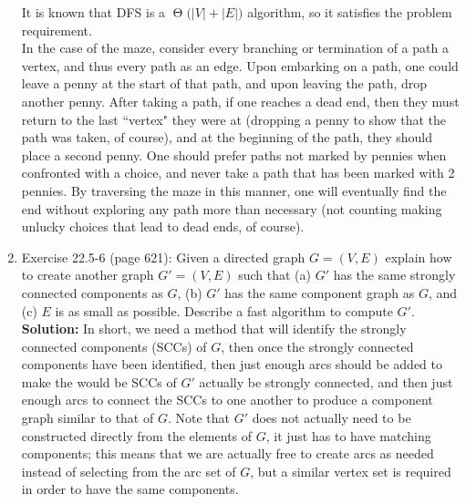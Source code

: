 \documentclass[11pts]{article}
\newcommand{\BigTheta}[1]{\ensuremath{\operatorname{\Theta}\bigl(#1\bigr)}}
\begin{document}
\begin{enumerate}
  It is known that DFS is a \BigTheta{ |V| + |E| } algorithm, so it
  satisfies the problem requirement. \\

  In the case of the maze, consider every branching or termination of a path
  a vertex, and thus every path as an edge. Upon embarking on a path,
  one could leave a penny at the start of that path, and upon leaving the
  path, drop another penny. After taking a path, if one reaches a dead end,
  then they must return to the last ``vertex" they were at (dropping a penny
  to show that the path was taken, of course), and at the beginning of the
  path, they should place a second penny. One should prefer paths not
  marked by pennies when confronted with a choice, and never take a
  path that has been marked with 2 pennies. By traversing the maze in
  this manner, one will eventually find the end without exploring any
  path more than necessary (not counting making unlucky choices that
  lead to dead ends, of course). \\

\newpage
\item Exercise 22.5-6 (page 621): Given a directed graph $G = ( V, E )$
explain how to create another graph $G' = ( V, E )$ such that (a) $G'$ has
the same strongly connected components as $G$, (b) $G'$
has the same component graph as $G$, and (c) $E$ is as small as
possible. Describe a fast algorithm to compute $G'$. \\

  \textbf{Solution:} In short, we need a method that will identify the
  strongly connected components (SCCs) of $G$, then once the strongly
  connected components have been identified, then just enough arcs
  should be added to make the would be SCCs of $G'$ actually be
  strongly connected, and then just enough arcs to connect the SCCs to
  one another to produce a component graph similar to that of $G$. Note
  that $G'$ does not actually need to be constructed directly from the
  elements of $G$, it just has to have matching components; this means
  that we are actually free to create arcs as needed instead of selecting
  from the arc set of $G$, but a similar vertex set is required in order
  to have the same components. \\


\end{enumerate}
\end{document}
